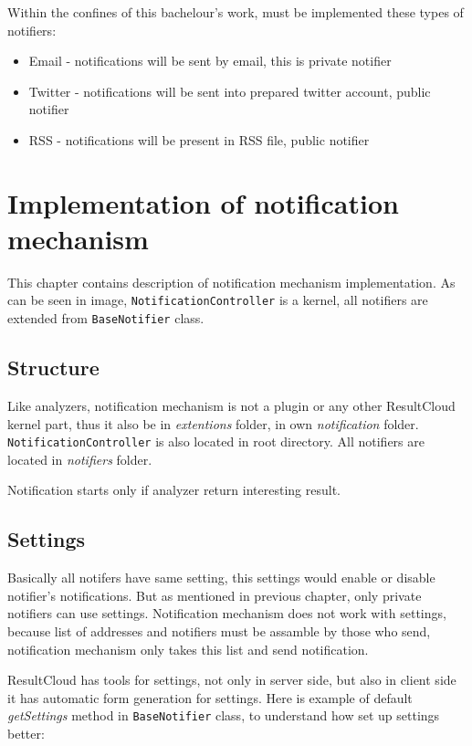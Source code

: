 Within the confines of this bachelour's work, must be implemented these types of notifiers:
\begin{itemize} 
\item Email - notifications will be sent by email, this is private notifier
\item Twitter - notifications will be sent into prepared twitter account, public notifier
\item RSS - notifications will be present in RSS file, public notifier
\end{itemize}  

\chapter{Implementation of notification mechanism}
\label{ch:notification_implement}

This chapter contains description of notification mechanism implementation. As can be seen in image, \texttt{NotificationController} is a kernel, all notifiers are extended from \texttt{BaseNotifier} class.

\section{Structure}

Like analyzers, notification mechanism is not a plugin or any other ResultCloud kernel part, thus it also be in \emph{extentions} folder, in own \emph{notification} folder. \texttt{NotificationController} is also located in root directory. All notifiers are located in \emph{notifiers} folder.

Notification starts only if analyzer return interesting result.

\section{Settings}

Basically all notifers have same setting, this settings would enable or disable notifier's notifications. But as mentioned in previous chapter, only private notifiers can use settings. Notification mechanism does not work with settings, because list of addresses and notifiers must be assamble by those who send, notification mechanism only takes this list and send notification. 

ResultCloud has tools for settings, not only in server side, but also in client side it has automatic form generation for settings. Here is example of default \emph{getSettings} method in \texttt{BaseNotifier} class, to understand how set up settings better:

